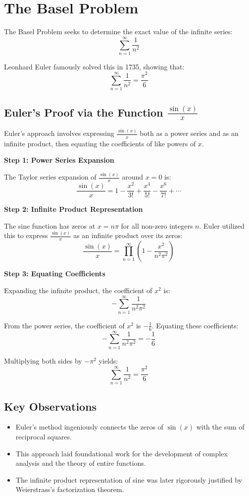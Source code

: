 \section{The Basel Problem}

The Basel Problem seeks to determine the exact value of the infinite series:
\[
\sum_{n=1}^{\infty} \frac{1}{n^2}
\]

Leonhard Euler famously solved this in 1735, showing that:
\[
\sum_{n=1}^{\infty} \frac{1}{n^2} = \frac{\pi^2}{6}
\]

\subsection{Euler's Proof via the Function \( \frac{\sin(x)}{x} \)}

Euler's approach involves expressing \( \frac{\sin(x)}{x} \) both as a power series and as an infinite product, then equating the coefficients of like powers of \( x \).

\textbf{Step 1: Power Series Expansion}

The Taylor series expansion of \( \frac{\sin(x)}{x} \) around \( x = 0 \) is:
\[
\frac{\sin(x)}{x} = 1 - \frac{x^2}{3!} + \frac{x^4}{5!} - \frac{x^6}{7!} + \cdots
\]

\textbf{Step 2: Infinite Product Representation}

The sine function has zeros at \( x = n\pi \) for all non-zero integers \( n \). Euler utilized this to express \( \frac{\sin(x)}{x} \) as an infinite product over its zeros:
\[
\frac{\sin(x)}{x} = \prod_{n=1}^{\infty} \left(1 - \frac{x^2}{n^2\pi^2}\right)
\]

\textbf{Step 3: Equating Coefficients}

Expanding the infinite product, the coefficient of \( x^2 \) is:
\[
-\sum_{n=1}^{\infty} \frac{1}{n^2\pi^2}
\]

From the power series, the coefficient of \( x^2 \) is \( -\frac{1}{6} \). Equating these coefficients:
\[
-\sum_{n=1}^{\infty} \frac{1}{n^2\pi^2} = -\frac{1}{6}
\]

Multiplying both sides by \( -\pi^2 \) yields:
\[
\sum_{n=1}^{\infty} \frac{1}{n^2} = \frac{\pi^2}{6}
\]

\subsection{Key Observations}

\begin{itemize}[label=\(-\)]
    \item Euler's method ingeniously connects the zeros of \( \sin(x) \) with the sum of reciprocal squares.
    \item This approach laid foundational work for the development of complex analysis and the theory of entire functions.
    \item The infinite product representation of sine was later rigorously justified by Weierstrass's factorization theorem.
\end{itemize}
